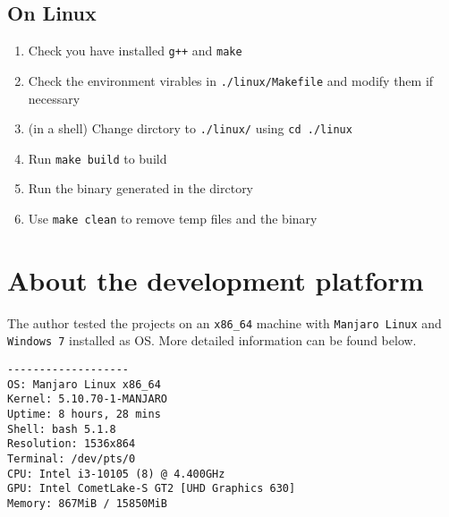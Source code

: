 \documentclass[cn,black,12pt,normal]{elegantnote}
\begin{document}
\subsection{On Linux}

\begin{enumerate}
    \item Check you have installed \lstinline{g++} and \lstinline{make}
    \item Check the environment virables in \lstinline{./linux/Makefile} and modify them if necessary
    \item (in a shell) Change dirctory to \lstinline{./linux/} using \lstinline{cd ./linux}
    \item Run \lstinline{make build} to build
    \item Run the binary generated in the dirctory
    \item Use \lstinline{make clean} to remove temp files and the binary
\end{enumerate}

\section{About the development platform}

The author tested the projects on an \lstinline{x86_64} machine with \lstinline{Manjaro Linux} and \lstinline{Windows 7} installed as OS. More detailed information can be found below.

\begin{lstlisting}
-------------------
OS: Manjaro Linux x86_64
Kernel: 5.10.70-1-MANJARO
Uptime: 8 hours, 28 mins
Shell: bash 5.1.8
Resolution: 1536x864
Terminal: /dev/pts/0
CPU: Intel i3-10105 (8) @ 4.400GHz
GPU: Intel CometLake-S GT2 [UHD Graphics 630]
Memory: 867MiB / 15850MiB
\end{lstlisting}


\end{document}
